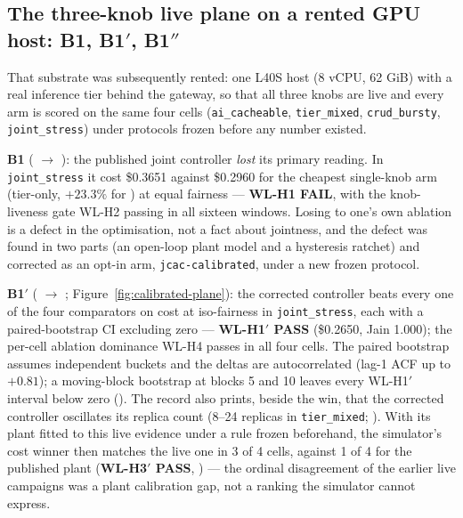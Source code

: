\subsection{The three-knob live plane on a rented GPU host: B1, B1$'$, B1$''$}
\label{sec:eval-live-plane}

That substrate was subsequently rented: one L40S host (8 vCPU, 62 GiB) with
a real inference tier behind the gateway, so that all three knobs are live
and every arm is scored on the same four cells (\texttt{ai\_cacheable},
\texttt{tier\_mixed}, \texttt{crud\_bursty}, \texttt{joint\_stress}) under
protocols frozen before any number existed.

\textbf{B1} ( $\to$
): the published joint controller
\emph{lost} its primary reading. In \texttt{joint\_stress} it cost \$0.3651
against \$0.2960 for the cheapest single-knob arm (tier-only, $+23.3\%$ for
\jcac{}) at equal fairness --- \textbf{WL-H1 FAIL}, with the knob-liveness
gate WL-H2 passing in all sixteen windows. Losing to one's own ablation is a
defect in the optimisation, not a fact about jointness, and the defect was
found in two parts (an open-loop plant model and a hysteresis ratchet) and
corrected as an opt-in arm, \texttt{jcac-calibrated}, under a new frozen
protocol.

\textbf{B1$'$} ( $\to$
; Figure~\ref{fig:calibrated-plane}):
the corrected controller beats every one of the four comparators on cost at
iso-fairness in \texttt{joint\_stress}, each with a paired-bootstrap CI
excluding zero --- \textbf{WL-H1$'$ PASS} (\$0.2650, Jain 1.000); the
per-cell ablation dominance WL-H4 passes in all four cells. The paired
bootstrap assumes independent buckets and the deltas are autocorrelated
(lag-1 ACF up to $+0.81$); a moving-block bootstrap at blocks 5 and 10
leaves every WL-H1$'$ interval below zero
(). The record also prints,
beside the win, that the corrected controller oscillates its replica count
(8--24 replicas in \texttt{tier\_mixed};
). With its plant fitted to this live
evidence under a rule frozen beforehand, the simulator's cost winner then
matches the live one in 3 of 4 cells, against 1 of 4 for the published
plant (\textbf{WL-H3$'$ PASS}, )
--- the ordinal disagreement of the earlier live campaigns was a plant
calibration gap, not a ranking the simulator cannot express.

